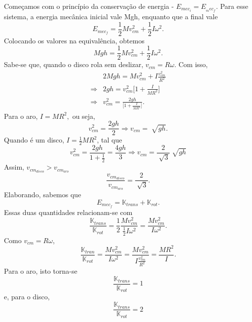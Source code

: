\documentclass{article}
\begin{document}
  Começamos com o princípio da conservação de energia - \(E_{mec_{i}} = E_{_mec_{f}}\). Para esse sistema, a energia mecânica inicial
vale Mgh, enquanto que a final vale 
  \[
    E_{mec_{f}} = \frac{1}{2}Mv_{cm}^{2} + \frac{1}{2}I\omega^{2}.
  \]
  Colocando os valores na equivalência, obtemos 
    \[
      Mgh = \frac{1}{2}Mv_{cm}^{2} + \frac{1}{2}I\omega^{2}.
    \]
  Sabe-se que, quando o disco rola sem deslizar, \(v_{cm} = R\omega \). Com isso,
 \begin{align*}
   &2Mgh = Mv_{cm}^{2} + I \frac{v_{cm}^{2}}{R^{2}}\\
   \Rightarrow &2gh = v_{cm}^{2}\biggl[1 + \frac{I}{MR^{2}}\biggr]\\
   \Rightarrow &v_{cm}^{2} = \frac{2gh}{\biggl[1 + \frac{I}{MR^{2}}\biggr]}.
 \end{align*}
 Para o aro, \(I = MR^{2},\) ou seja, 
   \[
     v_{cm}^{2} = \frac{2gh}{2} \Rightarrow v_{cm}=\sqrt[]{gh}.
   \]
  Quando é um disco, \(I=\frac{1}{2}MR^{2}\), tal que 
    \[
      v_{cm}^{2} = \frac{2gh}{1 + \frac{1}{2}} = \frac{4gh}{3} \Rightarrow v_{cm} = \frac{2}{\sqrt[]{3}}\sqrt[]{gh}
    \]
  Assim, \(v_{cm_{disco}} > v_{cm_{aro}}\)
    \[
      \frac{v_{cm_{disco}}}{v_{cm_{aro}}} = \frac{2}{\sqrt[]{3}}.
    \]
  Elaborando, sabemos que 
    \[
      E_{mec_{f}} = \mathbb{K}_{trans} + \mathbb{K}_{rot}.
    \]
  Essas duas quantidades relacionam-se com 
    \[
      \frac{\mathbb{K}_{trans}}{\mathbb{K}_{rot}} = \frac{1}{2}\frac{Mv_{cm}^{2}}{\frac{1}{2}I\omega^{2}} = \frac{Mv_{cm}^{2}}{I\omega^{2}}.
    \]
  Como \(v_{cm}=R\omega \), 
    \[
      \frac{\mathbb{K}_{tran}}{\mathbb{K}_{rot}} = \frac{Mv_{cm}^{2}}{I\omega^{2}}=\frac{Mv_{cm}^{2}}{I \frac{v_{cm}^{2}}{R^{2}}} = \frac{MR^{2}}{I}.
    \]
  Para o aro, isto torna-se 
    \[
      \frac{\mathbb{K}_{trans}}{\mathbb{K}_{rot}} = 1
    \]
  e, para o disco, 
    \[
      \frac{\mathbb{K}_{trans}}{\mathbb{K}_{rot}} = 2
    \]
\end{document}
